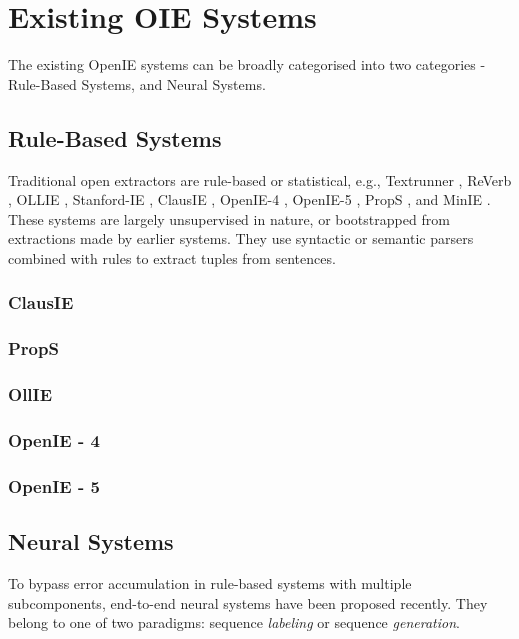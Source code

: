 \section{Existing OIE Systems}

    The existing OpenIE systems can be broadly categorised into two categories - Rule-Based Systems, and Neural Systems.

    \subsection{Rule-Based Systems}
        Traditional open extractors are rule-based or statistical, e.g., Textrunner \cite{banko&al07}, ReVerb \cite{Fader&al11,etzioni-ijcai11}, OLLIE \cite{Mausam&al12}, Stanford-IE \cite{angeli&al15}, ClausIE \cite{corro&al13}, OpenIE-4 \cite{christensen&al11,pal&al16}, OpenIE-5 \cite{Saha&al2017, Saha2018OpenIE}, PropS \cite{Stanovsky&al2016}, and MinIE \cite{gashteovski&al17}. These systems are largely unsupervised in nature, or bootstrapped from extractions made by earlier systems. They use syntactic or semantic parsers combined with rules to extract tuples from sentences.

        \subsubsection{ClausIE}
        \subsubsection{PropS}
        \subsubsection{OllIE}
        \subsubsection{OpenIE - 4}
        \subsubsection{OpenIE - 5}

    \subsection{Neural Systems}
        To bypass error accumulation in rule-based systems with multiple subcomponents, end-to-end neural systems have been proposed recently. They belong to one of two paradigms: sequence \textit{labeling} or sequence \textit{generation}.

